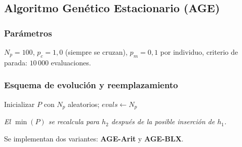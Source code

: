 \documentclass[12pt,a4paper]{article}
\begin{document}
\subsection{Algoritmo Genético Estacionario (AGE)}

\subsubsection*{Parámetros}
$N_p=100$, $p_c=1{,}0$ (siempre se cruzan), $p_m=0{,}1$ por individuo,
criterio de parada: $10\,000$ evaluaciones.

\subsubsection*{Esquema de evolución y reemplazamiento}

\begin{algorithm}[H]
\caption{AGE (estacionario)}
 
Inicializar $P$ con $N_p$ aleatorios; $evals \leftarrow N_p$\;
\end{algorithm}

\textit{El $\min(P)$ se recalcula para $h_2$ después de la posible inserción de $h_1$.}

Se implementan dos variantes: \textbf{AGE-Arit} y \textbf{AGE-BLX}.
\end{document}
